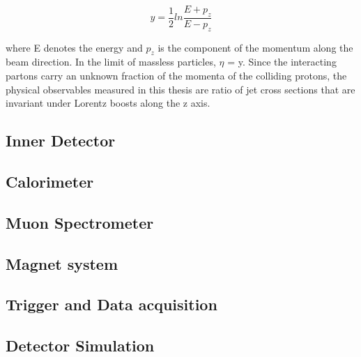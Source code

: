 \begin{equation} \label{eq:rapidity}
        y = \frac{1}{2} ln \frac{E+p_{z}}{E-p_{z}}
             \end{equation}

 where E denotes the energy and $p_{z}$ is the component of the momentum along the beam direction. In the limit of massless particles, $\eta$ = y. Since the interacting partons carry an unknown fraction of
the momenta of the colliding protons, the physical observables measured in this thesis are ratio of jet cross sections that are invariant under Lorentz boosts along the z axis.


\subsection{Inner Detector}
\subsection{Calorimeter}
\subsection{Muon Spectrometer}
\subsection{Magnet system}
\subsection{Trigger and Data acquisition}
\subsection{Detector Simulation}


